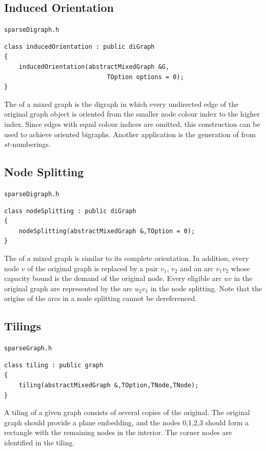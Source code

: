 \documentclass[a4paper,11pt,twoside]{book}
\begin{document}
\begin{multicols}{2}
\subsection{Induced Orientation}
\label{sbl_induced_orientation}
\myinclude\verb/sparseDigraph.h/
\begin{mymethods}
\begin{verbatim}
class inducedOrientation : public diGraph
{
    inducedOrientation(abstractMixedGraph &G,
                            TOption options = 0);
}
\end{verbatim}
\end{mymethods}
The  of a mixed graph is the digraph in which every
undirected edge of the original graph object is oriented from the smaller node
colour index to the higher index. Since edges with equal colour indices are
omitted, this construction can be used to achieve oriented bigraphs. Another
application is the generation of  from $st$-numberings.


\subsection{Node Splitting}
\label{slb_node_splitting}
\myinclude\verb/sparseDigraph.h/
\begin{mymethods}
\begin{verbatim}
class nodeSplitting : public diGraph
{
    nodeSplitting(abstractMixedGraph &,TOption = 0);
}
\end{verbatim}
\end{mymethods}
The  of a mixed graph is similar to its complete
orientation. In addition, every node $v$ of the original graph is replaced
by a pair $v_1$, $v_2$ and an arc $v_1 v_2$ whose capacity bound is the
demand of the original node. Every eligible arc $uv$ in the original graph are
represented by the arc $u_2 v_1$ in the node splitting.
Note that the origins of the arcs in a node splitting cannot be dereferenced.


\subsection{Tilings}
\label{slb_tiling}
\myinclude\verb/sparseGraph.h/
\begin{mymethods}
\begin{verbatim}
class tiling : public graph
{
    tiling(abstractMixedGraph &,TOption,TNode,TNode);
}
\end{verbatim}
\end{mymethods}
A tiling of a given graph consists of several copies of the original. The original
graph should provide a plane embedding, and the nodes 0,1,2,3 should form a rectangle
with the remaining nodes in the interior. The corner nodes are identified in the tiling.


\end{multicols}
\end{document}
